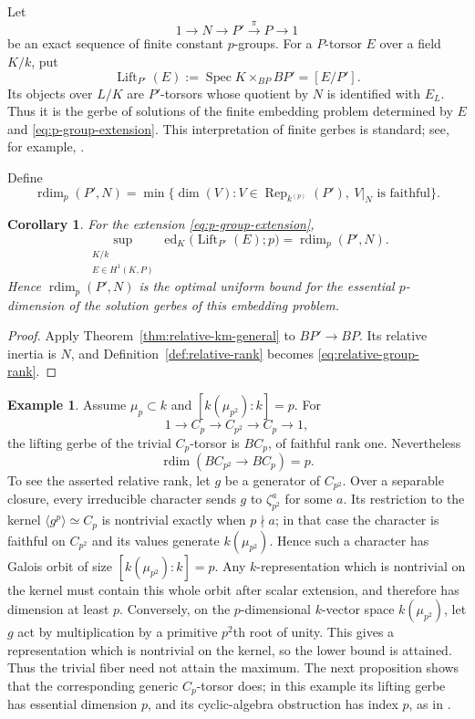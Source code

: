 \documentclass[11pt,reqno]{amsart}
\numberwithin{equation}{section}
\theoremstyle{plain}
\newtheorem{coro}[prop]{Corollary}
\theoremstyle{definition}
\newtheorem{exam}[prop]{Example}
\def\Spec{{\operatorname{Spec}}}
\def\ra{{\rightarrow}}
\def\Rep{{\operatorname{Rep}}}
\def\rdim{{\operatorname{rdim}}}
\def\ed{{\operatorname{ed}}}
\begin{document}
Let
\begin{equation}\label{eq:p-group-extension}
1\ra N\ra P'
\xrightarrow{\pi}P\ra1
\end{equation}
be an exact sequence of finite constant $p$-groups.  For a $P$-torsor
$E$ over a field $K/k$, put
\[
\operatorname{Lift}_{P'}(E)
:=\Spec K\times_{BP}BP'=[E/P'].
\]
Its objects over $L/K$ are $P'$-torsors whose quotient by $N$ is
identified with $E_L$.  Thus it is the gerbe of solutions of the finite
embedding problem determined by $E$ and \eqref{eq:p-group-extension}.
This interpretation of finite gerbes is standard; see, for example,
\cite[Section~5]{BRV}.

Define
\begin{equation}\label{eq:relative-group-rank}
\rdim_p(P',N)=
\min\{\dim(V):V\in\Rep_{k^{(p)}}(P'),
                     \ V|_N\text{ is faithful}\}.
\end{equation}

\begin{coro}
\label{cor:embedding-problem}
For the extension \eqref{eq:p-group-extension},
\[
\sup_{\substack{K/k\\E\in H^1(K,P)}}
\ed_K\bigl(\operatorname{Lift}_{P'}(E);p\bigr)
=\rdim_p(P',N).
\]
Hence $\rdim_p(P',N)$ is the optimal uniform bound for the essential
$p$-dimension of the solution gerbes of this embedding problem.
\end{coro}

\begin{proof}
Apply Theorem~\ref{thm:relative-km-general} to
$BP'\to BP$.  Its relative inertia is $N$, and
Definition~\ref{def:relative-rank} becomes
\eqref{eq:relative-group-rank}.
\end{proof}

\begin{exam}
\label{ex:cyclic-relative-rank}
Assume $\mu_p\subset k$ and
$[k(\mu_{p^2}):k]=p$.  For
\[
1\ra C_p\ra C_{p^2}
\ra C_p\ra1,
\]
the lifting gerbe of the trivial $C_p$-torsor is $BC_p$, of faithful
rank one.  Nevertheless
\[
\rdim(BC_{p^2}\to BC_p)=p.
\]
To see the asserted relative rank, let $g$ be a generator of $C_{p^2}$.
Over a separable closure, every irreducible character sends $g$ to
$\zeta_{p^2}^a$ for some $a$.  Its restriction to the kernel
$\langle g^p\rangle\simeq C_p$ is nontrivial exactly when $p\nmid a$; in
that case the character is faithful on $C_{p^2}$ and its values generate
$k(\mu_{p^2})$.  Hence such a character has Galois orbit of size
$[k(\mu_{p^2}):k]=p$.  Any $k$-representation which is nontrivial on the
kernel must contain this whole orbit after scalar extension, and therefore
has dimension at least $p$.  Conversely, on the $p$-dimensional
$k$-vector space $k(\mu_{p^2})$, let $g$ act by multiplication by a
primitive $p^2$th root of unity.  This gives a representation which is
nontrivial on the kernel, so the lower bound is attained.
Thus the trivial fiber need not attain the maximum.  The next proposition
shows that the corresponding generic $C_p$-torsor does; in this example its lifting gerbe
has essential dimension $p$, and its cyclic-algebra obstruction has index
$p$, as in \cite[Example~4.6]{KM}.

\end{exam}
\end{document}
